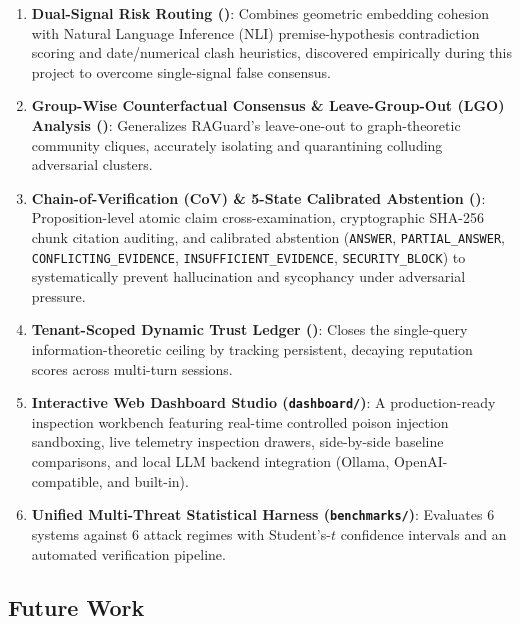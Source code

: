 \begin{enumerate}
\item \textbf{Dual-Signal Risk Routing ()}:
  Combines geometric embedding cohesion with Natural Language Inference (NLI)
  premise-hypothesis contradiction scoring and date/numerical clash heuristics,
  discovered empirically during this project to overcome single-signal false
  consensus.
\item \textbf{Group-Wise Counterfactual Consensus \& Leave-Group-Out (LGO) Analysis ()}:
  Generalizes RAGuard's leave-one-out to graph-theoretic community cliques,
  accurately isolating and quarantining colluding adversarial clusters.
\item \textbf{Chain-of-Verification (CoV) \& 5-State Calibrated Abstention ()}:
  Proposition-level atomic claim cross-examination, cryptographic SHA-256 chunk
  citation auditing, and calibrated abstention (\texttt{ANSWER}, \texttt{PARTIAL\_ANSWER},
  \texttt{CONFLICTING\_EVIDENCE}, \texttt{INSUFFICIENT\_EVIDENCE}, \texttt{SECURITY\_BLOCK})
  to systematically prevent hallucination and sycophancy under adversarial pressure.
\item \textbf{Tenant-Scoped Dynamic Trust Ledger ()}:
  Closes the single-query information-theoretic ceiling by tracking persistent,
  decaying reputation scores across multi-turn sessions.
\item \textbf{Interactive Web Dashboard Studio (\texttt{dashboard/})}:
  A production-ready inspection workbench featuring real-time controlled poison
  injection sandboxing, live telemetry inspection drawers, side-by-side baseline
  comparisons, and local LLM backend integration (Ollama, OpenAI-compatible, and built-in).
\item \textbf{Unified Multi-Threat Statistical Harness (\texttt{benchmarks/})}:
  Evaluates 6 systems against 6 attack regimes with Student's-$t$ confidence
  intervals and an automated verification pipeline.
\end{enumerate}

\subsection{Future Work}
\label{sec:future-work}

